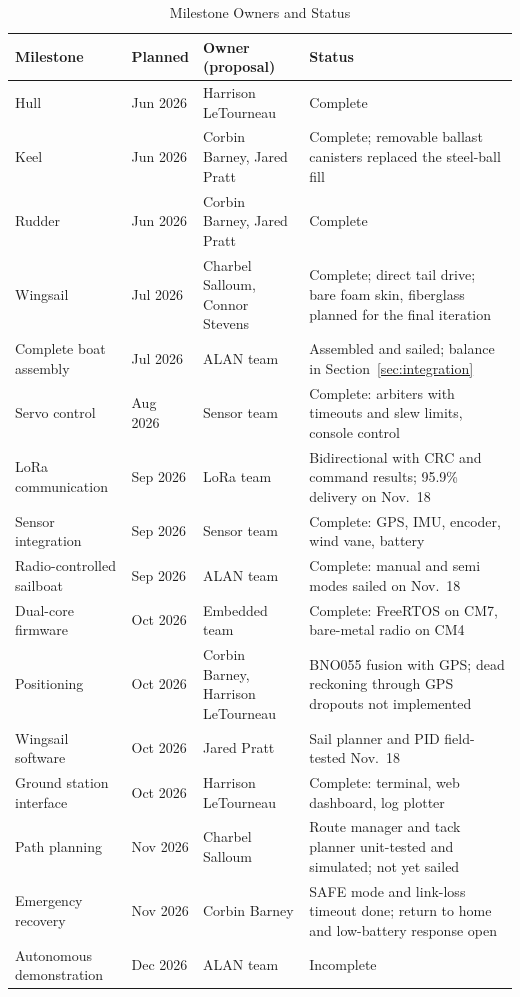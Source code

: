 \begin{table}[!t]
\caption{Milestone Owners and Status}
\label{tab:schedule}
\centering
\footnotesize
\begin{tabular}{@{}>{\raggedright\arraybackslash}p{}l>{\raggedright\arraybackslash}p{}>{\raggedright\arraybackslash}p{}@{}}
\toprule
Milestone & Planned & Owner (proposal) & Status \\
\midrule
Hull                      & Jun 2026 & Harrison LeTourneau & Complete \\
Keel                      & Jun 2026 & Corbin Barney, Jared Pratt & Complete; removable ballast canisters replaced the steel-ball fill \\
Rudder                    & Jun 2026 & Corbin Barney, Jared Pratt & Complete \\
Wingsail                  & Jul 2026 & Charbel Salloum, Connor Stevens & Complete; direct tail drive; bare foam skin, fiberglass planned for the final iteration \\
Complete boat assembly    & Jul 2026 & ALAN team & Assembled and sailed; balance in Section~\ref{sec:integration} \\
Servo control             & Aug 2026 & Sensor team & Complete: arbiters with timeouts and slew limits, console control \\
LoRa communication        & Sep 2026 & LoRa team & Bidirectional with CRC and command results; 95.9\% delivery on Nov.\ 18 \\
Sensor integration        & Sep 2026 & Sensor team & Complete: GPS, IMU, encoder, wind vane, battery \\
Radio-controlled sailboat               & Sep 2026 & ALAN team & Complete: manual and semi modes sailed on Nov.\ 18 \\
Dual-core firmware        & Oct 2026 & Embedded team & Complete: FreeRTOS on CM7, bare-metal radio on CM4 \\
Positioning               & Oct 2026 & Corbin Barney, Harrison LeTourneau & BNO055 fusion with GPS; dead reckoning through GPS dropouts not implemented \\
Wingsail software         & Oct 2026 & Jared Pratt & Sail planner and PID field-tested Nov.\ 18 \\
Ground station interface  & Oct 2026 & Harrison LeTourneau & Complete: terminal, web dashboard, log plotter \\
Path planning             & Nov 2026 & Charbel Salloum & Route manager and tack planner unit-tested and simulated; not yet sailed \\
Emergency recovery        & Nov 2026 & Corbin Barney & SAFE mode and link-loss timeout done; return to home and low-battery response open \\
Autonomous demonstration  & Dec 2026 & ALAN team & Incomplete \\
\bottomrule
\end{tabular}
\end{table}


